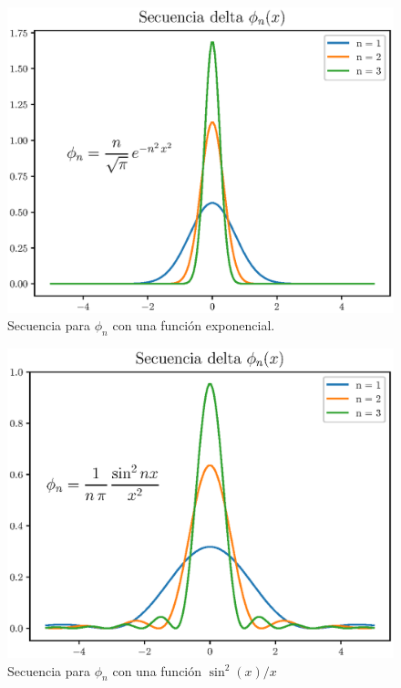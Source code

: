 \begin{figure}[H]
    \centering
    \includegraphics[scale=0.8]{Imagenes/secuencia_delta_02.eps}
    \caption{Secuencia para $\phi_{n}$ con una función exponencial.}
    \label{fig:plot_secuencia_02}
\end{figure}

\begin{figure}[H]
    \centering
    \includegraphics[scale=0.8]{Imagenes/secuencia_delta_03.eps}
    \caption{Secuencia para $\phi_{n}$ con una función $\sin^{2}(x)/x$}
    \label{fig:plot_secuencia_03}
\end{figure}

